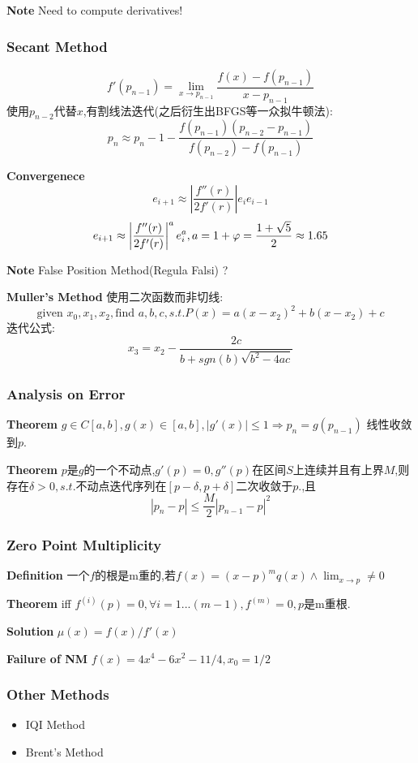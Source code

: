 \documentclass{article}
\begin{document}
\textbf{Note} Need to compute derivatives!

\subsubsection{Secant Method}
$$f'(p_{n-1})=\lim_{x\to p_{n-1}} \frac{f(x)-f(p_{n-1})}{x-p_{n-1}}$$
使用$p_{n-2}$代替$x$,有割线法迭代(之后衍生出BFGS等一众拟牛顿法):
$$p_n\approx p_n-1-\frac{f(p_{n-1})(p_{n-2}-p_{n-1})}{f(p_{n-2})-f(p_{n-1})}$$

\textbf{Convergenece}
$$e_{i+1}\approx \left|\frac{f''(r)}{2f'(r)}\right| e_ie_{i-1}$$
\tRarr
$$e_{i+1}\approx \left|\frac{f''(r)}{2f'(r)}\right|^a e_i^a,\\
    a=1+\varphi =\frac{1+\sqrt{5}}{2}\approx 1.65$$

\textbf{Note} False Position Method(Regula Falsi) ?

\textbf{Muller's Method} 使用二次函数而非切线:
$$
    \text{given }x_0, x_1, x_2, \text{find }a, b, c, s.t. P(x)=a(x-x_2)^2+b(x-x_2)+c
$$
迭代公式:
$$
    x_3=x_2-\frac{2c}{b+sgn(b)\sqrt{b^2-4ac}}
$$

\subsubsection{Analysis on Error}

\textbf{Theorem} $g\in C[a,b], g(x)\in [a, b], |g'(x)|\le 1 \Rightarrow p_n=g(p_{n-1})$ 线性收敛到$p$.

\textbf{Theorem} $p$是$g$的一个不动点,$g'(p)=0,g''(p)$在区间$S$上连续并且有上界$M$,则存在$\delta>0, s.t.$不动点迭代序列在$[p-\delta, p+\delta]$二次收敛于$p$.,且
$$|p_n-p|\le \frac{M}{2}|p_{n-1}-p|^2$$

\subsubsection{Zero Point Multiplicity}

\textbf{Definition} 一个$f$的根是m重的,若$f(x)=(x-p)^m q(x)\wedge \lim_{x\to p}\neq 0$

\textbf{Theorem} iff $f^{(i)}(p)=0,\forall i=1...(m-1),f^{(m)}=0,p$是m重根.

\textbf{Solution} $\mu(x)=f(x)/f'(x)$

\textbf{Failure of NM} $f(x)=4x^4-6x^2-11/4, x_0=1/2$

\subsubsection{Other Methods}
\begin{itemize}
    \item IQI Method
    \item Brent's Method
\end{itemize}
\end{document}
